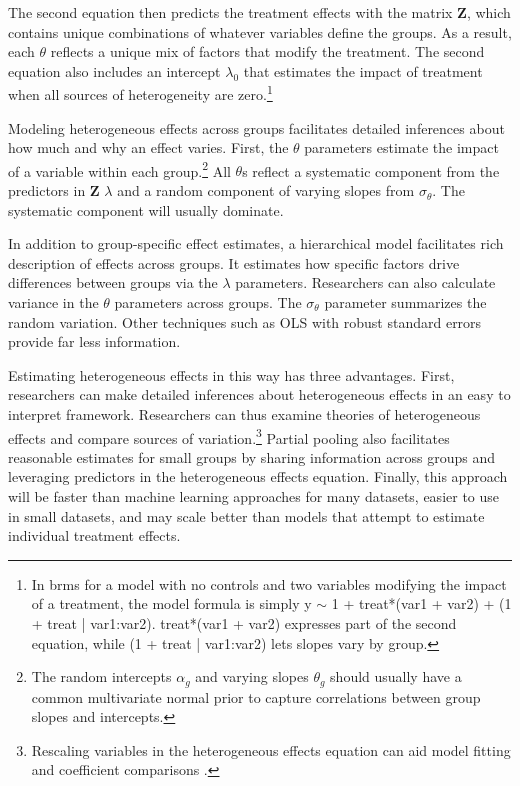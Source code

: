 \documentclass[12pt]{article}
\begin{document}
The second equation then predicts the treatment effects with the matrix \textbf{Z}, which contains unique combinations of whatever variables define the groups.  
As a result, each $\theta$ reflects a unique mix of factors that modify the treatment.
The second equation also includes an intercept $\lambda_0$ that estimates the impact of treatment when all sources of heterogeneity are zero.\footnote{In brms for a model with no controls and two variables modifying the impact of a treatment, the model formula is simply y $\sim$ 1 + treat*(var1 + var2) + (1 + treat | var1:var2). treat*(var1 + var2) expresses part of the second equation, while (1 + treat | var1:var2) lets slopes vary by group.}


Modeling heterogeneous effects across groups facilitates detailed inferences about how much and why an effect varies.
First, the $\theta$ parameters estimate the impact of a variable within each group.\footnote{The random intercepts $\alpha_g$ and varying slopes $\theta_g$ should usually have a common multivariate normal prior to capture correlations between group slopes and intercepts.}
All $\theta$s reflect a systematic component from the predictors in \textbf{Z} $\lambda$ and a random component of varying slopes from $\sigma_\theta$. 
The systematic component will usually dominate. 


In addition to group-specific effect estimates, a hierarchical model facilitates rich description of effects across groups. 
It estimates how specific factors drive differences between groups via the $\lambda$ parameters.
Researchers can also calculate variance in the $\theta$ parameters across groups.
The $\sigma_\theta$ parameter summarizes the random variation. 
Other techniques such as OLS with robust standard errors provide far less information.


Estimating heterogeneous effects in this way has three advantages.
First, researchers can make detailed inferences about heterogeneous effects in an easy to interpret framework. 
Researchers can thus examine theories of heterogeneous effects and compare sources of variation.\footnote{Rescaling variables in the heterogeneous effects equation can aid model fitting and coefficient comparisons \citep{Gelman2008}.} 
Partial pooling also facilitates reasonable estimates for small groups by sharing information across groups and leveraging predictors in the heterogeneous effects equation. 
Finally, this approach will be faster than machine learning approaches for many datasets, easier to use in small datasets, and may scale better than models that attempt to estimate individual treatment effects.
\end{document}
